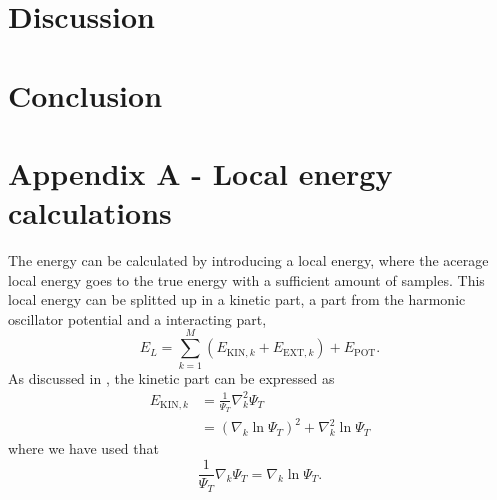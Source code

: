 \documentclass[norsk,a4paper,12pt]{article}
\begin{document}
\section{Discussion} \label{sec:Discussion}

\section{Conclusion} \label{sec:Conclusion}

\newpage

\section{Appendix A - Local energy calculations} \label{sec:appendix_A}
The energy can be calculated by introducing a local energy, where the acerage local energy goes to the true energy with a sufficient amount of samples. This local energy can be splitted up in a kinetic part, a part from the harmonic oscillator potential and a interacting part,
\begin{equation}
E_L=\sum_{k=1}^{M}(E_{\text{KIN},k} + E_{\text{EXT},k})+E_{\text{POT}}.
\end{equation}
As discussed in \cite{Nordhagen}, the kinetic part can be expressed as
\begin{align}
E_{\text{KIN},k}&=\frac{1}{\Psi_T}\nabla_k^2\Psi_T\\
&=(\nabla_k\ln\Psi_T)^2+\nabla_k^2\ln\Psi_T
\end{align}
where we have used that
\begin{equation}
\frac{1}{\Psi_T}\nabla_k\Psi_T=\nabla_k\ln\Psi_T.
\end{equation}
\end{document}
